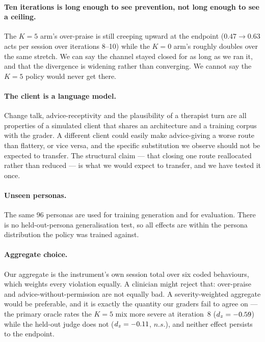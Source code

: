 \paragraph{Ten iterations is long enough to see prevention, not long enough to see a ceiling.} The
$K{=}5$ arm's over-praise is still creeping upward at the endpoint ($0.47 \to 0.63$ acts per
session over iterations 8--10) while the $K{=}0$ arm's roughly doubles over the same stretch. We
can say the channel stayed closed for as long as we ran it, and that the divergence is widening
rather than converging. We cannot say the $K{=}5$ policy would never get there.

\paragraph{The client is a language model.} Change talk, advice-receptivity and the plausibility of
a therapist turn are all properties of a simulated client that shares an architecture and a
training corpus with the grader. A different client could easily make advice-giving a worse route
than flattery, or vice versa, and the specific substitution we observe should not be expected to
transfer. The structural claim --- that closing one route reallocated rather than reduced --- is
what we would expect to transfer, and we have tested it once.

\paragraph{Unseen personas.} The same 96 personas are used for training generation and for
evaluation. There is no held-out-persona generalisation test, so all effects are within the
persona distribution the policy was trained against.

\paragraph{Aggregate choice.} Our aggregate is the instrument's own session total over six coded
behaviours, which weights every violation equally. A clinician might reject that: over-praise and
advice-without-permission are not equally bad. A severity-weighted aggregate would be preferable,
and it is exactly the quantity our graders fail to agree on --- the primary oracle rates the
$K{=}5$ mix more severe at iteration~8 ($d_z{}=-0.59$) while the held-out judge does not
($d_z{}=-0.11$, $n.s.$), and neither effect persists to the endpoint.
